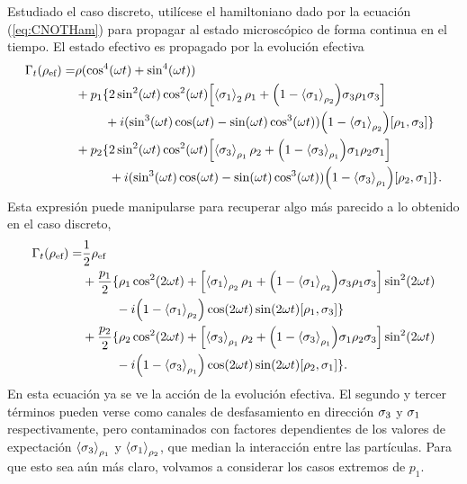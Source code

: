 Estudiado el caso discreto, utilícese el hamiltoniano dado por la ecuación (\ref{eq:CNOTHam}) para propagar al estado microscópico de forma continua en el tiempo. El estado efectivo es propagado por la evolución efectiva
\begin{align}
  \Gamma_{t}(\rho_{\text{ef}})=&\rho(\cos^{4}(\omega t)+\sin^{4}(\omega t))\nonumber\\
  &+p_{1}\{2\sin^{2}(\omega t)\cos^{2}(\omega
  t)\qty[\expval{\sigma_{1}}_{2}\rho_{1}+\qty(1-\expval{\sigma_{1}}_{\rho_{2}})\sigma_{3}\rho_{1}\sigma_{3}]\nonumber\\
  & \ \ \ \ \ \ \ +i(\sin^{3}(\omega t)\cos(\omega t)-\sin(\omega t)\cos^{3}(\omega t))\qty(1-\expval{\sigma_{1}}_{\rho_{2}})[\rho_{1},\sigma_{3}]\}\nonumber\\
  &+p_{2}\{2\sin^{2}(\omega t)\cos^{2}(\omega t)\qty[\expval{\sigma_{3}}_{\rho_{1}}\rho_{2}+\qty(1-\expval{\sigma_{3}}_{\rho_{1}})\sigma_{1}\rho_{2}\sigma_{1}]\nonumber\\
  &\ \ \ \ \ \ \ \ +i(\sin^{3}(\omega t)\cos(\omega t)-\sin(\omega t)\cos^{3}(\omega t))\qty(1-\expval{\sigma_{3}}_{\rho_{1}})[\rho_{2},\sigma_{1}]\}.\nonumber
\end{align} 
Esta expresión puede manipularse para recuperar algo más parecido a lo obtenido en el caso discreto,
\begin{align}\label{eq:EffectiveCNOT}
  \Gamma_{t}(\rho_{\ef})=&\frac{1}{2}\rho_{\ef}\nonumber\\
  &+\frac{p_{1}}{2}\{\rho_{1}\cos^{2}(2\omega t)+\qty[\expval{\pauli{1}}_{\rho_{2}}\rho_{1}+\qty(1-\expval{\pauli{1}}_{\rho_{2}})\pauli{3}\rho_{1}\pauli{3}]\sin^{2}(2\omega t)\nonumber\\
  & \ \ \ \ \ \ \ \ -i\qty(1-\expval{\pauli{1}}_{\rho_{2}})\cos(2\omega t)\sin(2\omega t)[\rho_{1},\pauli{3}]\}\nonumber\\
  &+\frac{p_{2}}{2}\{\rho_{2}\cos^{2}(2\omega t)+\qty[\expval{\pauli{3}}_{\rho_{1}}\rho_{2}+\qty(1-\expval{\pauli{3}}_{\rho_{1}})\pauli{1}\rho_{2}\pauli{3}]\sin^{2}(2\omega t)\nonumber\\
  & \ \ \ \ \ \ \ \ -i\qty(1-\expval{\pauli{3}}_{\rho_{1}})\cos(2\omega t)\sin(2\omega t)[\rho_{2},\pauli{1}]\}.
\end{align}
En esta ecuación ya se ve la acción de la evolución efectiva. El segundo y tercer términos pueden verse como canales de desfasamiento en dirección $\sigma_{3}$ y $\sigma_{1}$ respectivamente, pero contaminados con factores dependientes de los valores de expectación $\expval{\sigma_{3}}_{\rho_{1}}$ y $\expval{\sigma_{1}}_{\rho_{2}}$, que median la interacción entre las partículas. Para que esto sea aún más claro, volvamos a considerar los casos extremos de $p_{1}$.

